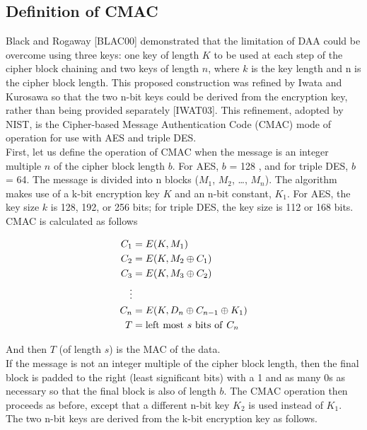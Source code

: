 \documentclass[12pt,a4paper,oneside]{report}
\begin{document}
\subsection{Definition of CMAC}

Black and Rogaway [BLAC00] demonstrated that the limitation of DAA could be
overcome using three keys: one key of length $K$ to be used at each step of the
cipher block chaining and two keys of length $n$, where $k$ is the key length and n is
the cipher block length. This proposed construction was refined by Iwata and
Kurosawa so that the two n-bit keys could be derived from the encryption key,
rather than being provided separately [IWAT03]. This refinement, adopted by
NIST, is the Cipher-based Message Authentication Code (CMAC) mode of operation
for use with AES and triple DES. \\

First, let us define the operation of CMAC when the message is an integer
multiple $n$ of the cipher block length $b$. For AES, $b$ = 128 , and for triple DES,
$b$ = 64. The message is divided into n blocks ($M_1$, $M_2$, \dots, $M_n$). The algorithm
makes use of a k-bit encryption key $K$ and an n-bit constant, $K_1$. For AES, the key
size $k$ is 128, 192, or 256 bits; for triple DES, the key size is 112 or 168 bits. CMAC is
calculated as follows 

\begin{align*}
    C_1 &= E(K,M_1) \\
    C_2 &= E(K,M_2 \oplus C_1) \\
    C_3 &= E(K,M_3 \oplus C_2) \\
    \vdots \\
    C_n &= E(K,D_n \oplus C_{n-1} \oplus K_1) \\
    T   &= {\rm left\ most\ }s{\rm\ bits\ of\ }C_n
\end{align*}

And then $T$ (of length $s$) is the MAC of the data.\\

If the message is not an integer multiple of the cipher block length, then the
final block is padded to the right (least significant bits) with a 1 and as many 0s as
necessary so that the final block is also of length $b$. The CMAC operation then proceeds
as before, except that a different n-bit key $K_2$ is used instead of $K_1$.\\

The two n-bit keys are derived from the k-bit encryption key as follows.
\end{document}
